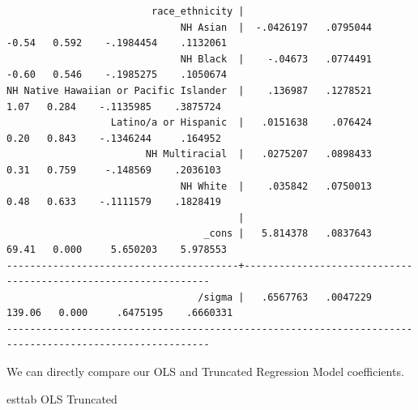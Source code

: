 \documentclass[
]{book}
\newenvironment{Shaded}{\begin{snugshade}}{\end{snugshade}}
\newcommand{\NormalTok}[1]{#1}
\begin{document}
\begin{verbatim}
                         race_ethnicity |
                              NH Asian  |  -.0426197   .0795044    -0.54   0.592    -.1984454    .1132061
                              NH Black  |    -.04673   .0774491    -0.60   0.546    -.1985275    .1050674
NH Native Hawaiian or Pacific Islander  |    .136987   .1278521     1.07   0.284    -.1135985    .3875724
                  Latino/a or Hispanic  |   .0151638    .076424     0.20   0.843    -.1346244     .164952
                        NH Multiracial  |   .0275207   .0898433     0.31   0.759     -.148569    .2036103
                              NH White  |    .035842   .0750013     0.48   0.633    -.1111579    .1828419
                                        |
                                  _cons |   5.814378   .0837643    69.41   0.000     5.650203    5.978553
----------------------------------------+----------------------------------------------------------------
                                 /sigma |   .6567763   .0047229   139.06   0.000     .6475195    .6660331
---------------------------------------------------------------------------------------------------------
\end{verbatim}

We can directly compare our OLS and Truncated Regression Model coefficients.

\begin{Shaded}
\begin{Highlighting}[]
\NormalTok{esttab OLS Truncated}
\end{Highlighting}
\end{Shaded}
\end{document}
